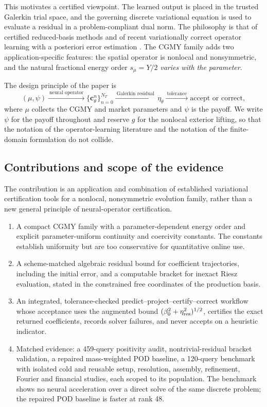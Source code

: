 \documentclass[11pt]{amsart}
\theoremstyle{remark}
\newcommand{\cc}{\mathbf c}
\begin{document}
This motivates a certified viewpoint.  The learned output is placed in the
trusted Galerkin trial space, and the governing discrete variational equation
is used to evaluate a residual in a problem-compliant dual norm.  The
philosophy is that of certified reduced-basis methods
\cite{GreplPatera2005,RozzaHuynhPatera2008,HaasdonkOhlberger2008} and of
recent variationally correct operator learning with a posteriori error
estimation \cite{QiuDahmenChen2026}.  The CGMY family adds two application-specific features: the spatial operator is nonlocal and nonsymmetric, and the
natural fractional energy order $s_\mu=Y/2$ \emph{varies with the parameter}.

The design principle of the paper is
\[
  (\mu,\psi)
  \xrightarrow{\ \text{neural operator}\ }
  \{\cc_\theta^n\}_{n=0}^{N_T}
  \xrightarrow{\ \text{Galerkin residual}\ }
  \eta_\theta
  \xrightarrow{\ \text{tolerance}\ }
  \text{accept or correct},
\]
where $\mu$ collects the CGMY and market parameters and $\psi$ is the payoff.
We write $\psi$ for the payoff throughout and reserve $g$ for the nonlocal
exterior lifting, so that the notation of the operator-learning literature and
the notation of the finite-domain formulation do not collide.

\subsection*{Contributions and scope of the evidence}

The contribution is an application and combination of established
variational certification tools for a nonlocal, nonsymmetric evolution family,
rather than a new general principle of neural-operator certification.
\begin{enumerate}[leftmargin=2em]
\item A compact CGMY family with a parameter-dependent energy order and
explicit parameter-uniform continuity and coercivity constants. The constants
establish uniformity but are too conservative for quantitative online use.
\item A scheme-matched algebraic residual bound for coefficient trajectories,
including the initial error, and a computable bracket for inexact Riesz
evaluation, stated in the constrained free coordinates of the production basis.
\item An integrated, tolerance-checked predict--project--certify--correct
workflow whose acceptance uses the augmented bound
$(\beta_0^2+\eta_{\rm res}^2)^{1/2}$, certifies the exact returned coefficients,
records solver failures, and never accepts on a heuristic indicator.
\item Matched evidence: a 459-query positivity audit, nontrivial-residual
bracket validation, a repaired mass-weighted POD baseline, a 120-query
benchmark with isolated cold and reusable setup, resolution, assembly,
refinement, Fourier and financial studies, each scoped to its population.
The benchmark shows no neural acceleration over a direct solve of the same
discrete problem; the repaired POD baseline is faster at rank 48.
\end{enumerate}
\end{document}
